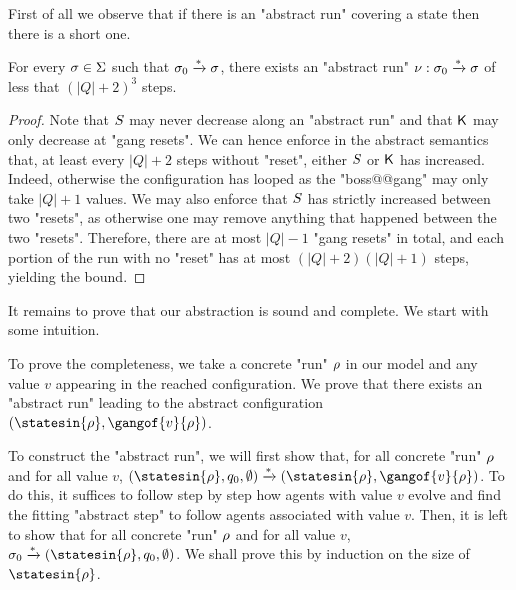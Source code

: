 First of all we observe that if there is an "abstract run" covering a state then there is a short one.

\begin{lemma}
	\label{lem:short-run}
	For every $\sigma \in \Sigma$ such that $\sigma_0 \xrightarrow{*} \sigma$, there exists an "abstract run" $\nu: \sigma_0 \xrightarrow{*} \sigma$ of less that $(|Q|+2)^3$ steps.
\end{lemma}

\ifproofs
\begin{proof}
	Note that $S$ may never decrease along an "abstract run" and that $\mathsf{K}$ may only decrease at "gang resets".
	We can hence enforce in the abstract semantics that, at least every $|Q|+2$ steps without "reset", either $S$ or $\mathsf{K}$ has increased. Indeed, otherwise the configuration has looped as the "boss@@gang" may only take $|Q| +1$ values. We may also enforce that $S$ has strictly increased between two "resets", as otherwise one may remove anything that happened between the two "resets". Therefore, there are at most $|Q|-1$ "gang resets" in total, and each portion of the run with no "reset" has at most $(|Q|+2)(|Q|+1)$ steps, yielding the bound. 
\end{proof}
\fi

It remains to prove that our abstraction is sound and complete. We start with some intuition.

To prove the completeness, we take a concrete "run" $\rho$ in our model and any value $v$ appearing in the reached configuration. We prove that there exists an "abstract run" leading to the abstract configuration $(\statesin{\run}, \gangof{v}{\run})$. 

To construct the "abstract run", we will first show that, for all concrete "run" $\rho$ and for all value $v$, $(\statesin{\run}, q_0, \emptyset) \step{\ast}(\statesin{\run}, \gangof{v}{\run})$. To do this, it suffices to follow step by step how agents with value $v$ evolve and find the fitting "abstract step" to follow agents associated with value $v$. 
Then, it is left to show that for all concrete "run" $\rho$ and for all value $v$, $\aconfiginit \step{\ast} (\statesin{\run}, q_0, \emptyset)$. We shall prove this by induction on the size of $\statesin{\run}$. 

